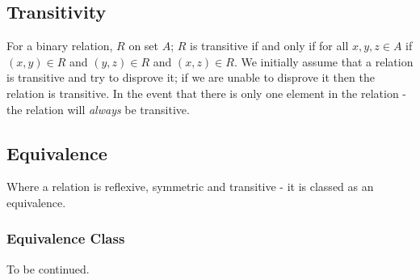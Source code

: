 \subsection{Transitivity}
For a binary relation, $R$ on set $A$; $R$ is transitive if and only if for all $x, y, z \in A$ if $(x, y) \in R$ and $(y, z) \in R$ and $(x, z) \in R$. We initially assume that a relation is transitive and try to disprove it; if we are unable to disprove it then the relation is transitive. In the event that there is only one element in the relation - the relation will \textit{always} be transitive.  

\begin{figure}[H]
    \centering
\end{figure}

\subsection{Equivalence}
Where a relation is reflexive, symmetric and transitive - it is classed as an equivalence. 

\subsubsection{Equivalence Class}

To be continued. 
